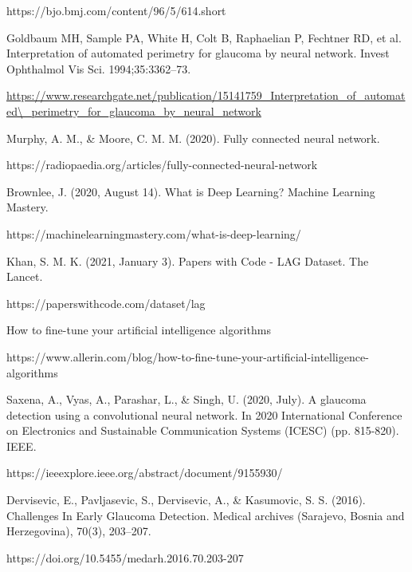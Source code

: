 \noindent https://bjo.bmj.com/content/96/5/614.short

\vspace{5mm}
\noindent[21] Goldbaum MH, Sample PA, White H, Colt B, Raphaelian P, Fechtner RD, et al. Interpretation of automated perimetry for glaucoma by neural network. Invest Ophthalmol Vis Sci. 1994;35:3362–73. 


\noindent\url{https://www.researchgate.net/publication/15141759_Interpretation_of_automated\\_perimetry_for_glaucoma_by_neural_network}

\vspace{5mm}
\noindent[22]  Murphy, A. M., & Moore, C. M. M. (2020). Fully connected neural network. 

\noindent https://radiopaedia.org/articles/fully-connected-neural-network

\vspace{5mm}
\noindent[23] Brownlee, J. (2020, August 14). What is Deep Learning? Machine Learning Mastery. 

\noindent https://machinelearningmastery.com/what-is-deep-learning/

\vspace{5mm}
\noindent[24] Khan, S. M. K. (2021, January 3). Papers with Code - LAG Dataset. The Lancet. 

\noindent https://paperswithcode.com/dataset/lag

\vspace{5mm}
\noindent[25] How to fine-tune your artificial intelligence algorithms 

\noindent https://www.allerin.com/blog/how-to-fine-tune-your-artificial-intelligence-algorithms

\vspace{5mm}
\noindent[26] Saxena, A., Vyas, A., Parashar, L., & Singh, U. (2020, July). A glaucoma detection using a convolutional neural network. In 2020 International Conference on Electronics and Sustainable Communication Systems (ICESC) (pp. 815-820). IEEE.

\noindent https://ieeexplore.ieee.org/abstract/document/9155930/

\vspace{5mm}
\noindent[27] Dervisevic, E., Pavljasevic, S., Dervisevic, A., & Kasumovic, S. S. (2016). Challenges In Early Glaucoma Detection. Medical archives (Sarajevo, Bosnia and Herzegovina), 70(3), 203–207. 

\noindent https://doi.org/10.5455/medarh.2016.70.203-207

